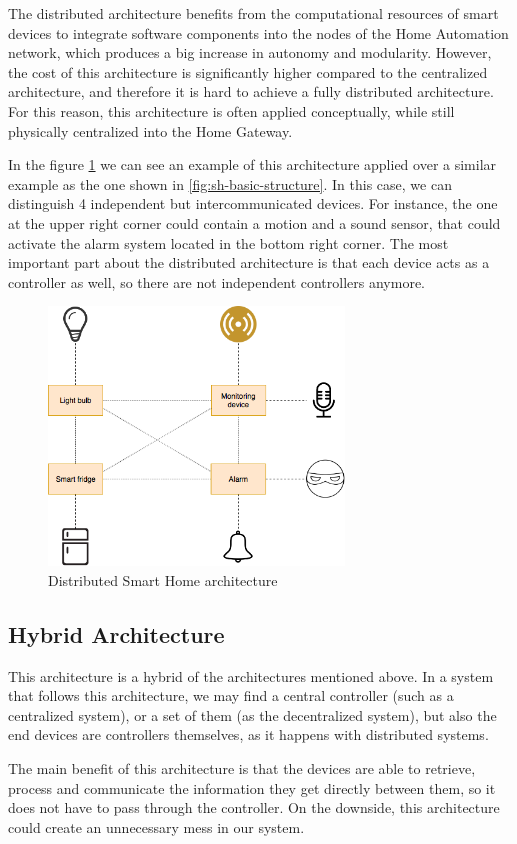 \bigskip
The distributed architecture benefits from the computational resources of smart devices to integrate software components into the 
nodes of the Home Automation network, which produces a big increase in autonomy and modularity\cite{raulCarreteroElegir}. 
However, the cost of this architecture is significantly higher compared to the centralized architecture, and therefore it is hard to achieve 
a fully distributed architecture. For this reason, this architecture is often applied conceptually, while still physically centralized into
the Home Gateway.

\bigskip
In the figure \ref{fig:distributed-sh-architecture} we can see an example of this architecture applied over a similar example as the one
shown in \ref{fig:sh-basic-structure}. In this case, we can distinguish 4 independent but intercommunicated devices. For instance, 
the one at the upper right corner could contain a motion and a sound sensor, that could activate the alarm system located in the bottom
right corner. The most important part about the distributed architecture is that each device acts as a controller as well, so there are not
independent controllers anymore.

\begin{figure}
	\centering
	\includegraphics[width=0.7\textwidth]{images/Chapter_02/distributed-sh-architecture.png}
	\caption{Distributed Smart Home architecture}
	\label{fig:distributed-sh-architecture}
\end{figure}

\subsection{Hybrid Architecture}
This architecture is a hybrid of the architectures mentioned above. In a system that follows this architecture, we may find
a central controller (such as a centralized system), or a set of them (as the decentralized system), but also the end devices are
controllers themselves, as it happens with distributed systems.

\bigskip
The main benefit of this architecture is that the devices are able to retrieve, process and communicate the information they get
directly between them, so it does not have to pass through the controller. On the downside, this architecture could create an 
unnecessary mess in our system.


